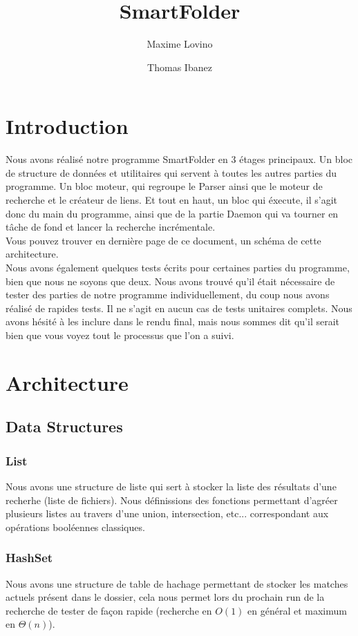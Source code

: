 \documentclass[a4paper]{article}
\title{SmartFolder}
\author{Maxime Lovino \and Thomas Ibanez}
\begin{document}
\maketitle
\newpage
\section{Introduction}
Nous avons réalisé notre programme SmartFolder en 3 étages principaux. Un bloc de structure de données et utilitaires qui servent à toutes les autres parties du programme. Un bloc moteur, qui regroupe le Parser ainsi que le moteur de recherche et le créateur de liens. Et tout en haut, un bloc qui éxecute, il s'agit donc du main du programme, ainsi que de la partie Daemon qui va tourner en tâche de fond et lancer la recherche incrémentale. \\

Vous pouvez trouver en dernière page de ce document, un schéma de cette architecture.\\

Nous avons également quelques tests écrits pour certaines parties du programme, bien que nous ne soyons que deux. Nous avons trouvé qu'il était nécessaire de tester des parties de notre programme individuellement, du coup nous avons réalisé de rapides tests. Il ne s'agit en aucun cas de tests unitaires complets. Nous avons hésité à les inclure dans le rendu final, mais nous sommes dit qu'il serait bien que vous voyez tout le processus que l'on a suivi.
\section{Architecture}
\subsection{Data Structures}
\subsubsection{List}
Nous avons une structure de liste qui sert à stocker la liste des résultats d'une recherhe (liste de fichiers). Nous définissions des fonctions permettant d'agréer plusieurs listes au travers d'une union, intersection, etc... correspondant aux opérations booléennes classiques.
\subsubsection{HashSet}
Nous avons une structure de table de hachage permettant de stocker les matches actuels présent dans le dossier, cela nous permet lors du prochain run de la recherche de tester de façon rapide (recherche en $O(1)$ en général et maximum en $\Theta(n)$).
\end{document}
